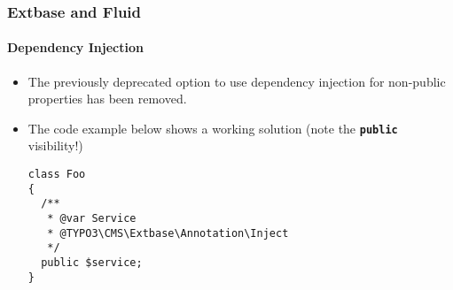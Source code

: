 %

\begin{frame}[fragile]
	\frametitle{Extbase and Fluid}
	\framesubtitle{Dependency Injection}


	\begin{itemize}
		\item The previously deprecated option to use dependency injection
			for non-public properties has been removed.
		\item The code example below shows a working solution\newline
			\small(note the \texttt{\textbf{public}} visibility!)\normalsize
\begin{lstlisting}
class Foo
{
  /**
   * @var Service
   * @TYPO3\CMS\Extbase\Annotation\Inject
   */
  public $service;
}
\end{lstlisting}

	\end{itemize}

\end{frame}

